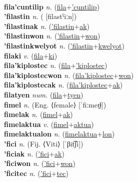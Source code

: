  \label{fila'cosawnwon} \\
\textbf{fila'cuntilip} \textit{n.} (\hyperref[fila]{fila}+\hyperref['cuntilip]{'cuntilip})
 \label{fila'cuntilip} \\
\textbf{'filastin} \textit{n.} ( [filastˁiːn])
 \label{'filastin} \\
\textbf{'filastinak} \textit{n.} (\hyperref['filastin]{'filastin}+\hyperref[ak]{ak})
 \label{'filastinak} \\
\textbf{'filastinwon} \textit{n.} (\hyperref['filastin]{'filastin}+\hyperref[won]{won})
 \label{'filastinwon} \\
\textbf{'filastinkwelyot} \textit{n.} (\hyperref['filastin]{'filastin}+\hyperref[kwelyot]{kwelyot})
 \label{'filastinkwelyot} \\
\textbf{filaki} \textit{v.} (\hyperref[fila]{fila}+\hyperref[ki]{ki})
 \label{filaki} \\
\textbf{fila'kiplostec} \textit{n.} (\hyperref[fila]{fila}+\hyperref['kiplostec]{'kiplostec})
 \label{fila'kiplostec} \\
\textbf{fila'kiplostecwon} \textit{n.} (\hyperref[fila'kiplostec]{fila'kiplostec}+\hyperref[won]{won})
 \label{fila'kiplostecwon} \\
\textbf{fila'kiplostecak} \textit{n.} (\hyperref[fila'kiplostec]{fila'kiplostec}+\hyperref[ak]{ak})
 \label{fila'kiplostecak} \\
\textbf{filatyen} \textit{num.} (\hyperref[fila]{fila}+\hyperref[tyen]{tyen})
 \label{filatyen} \\
\textbf{fimel} \textit{n.} (Eng. ⟨female⟩ [ˈfiːmeɪ̯ɫ])
 \label{fimel} \\
\textbf{fimelak} \textit{n.} (\hyperref[fimel]{fimel}+\hyperref[ak]{ak})
 \label{fimelak} \\
\textbf{fimelaktua} \textit{v.} (\hyperref[fimel]{fimel}+\hyperref[aktua]{aktua})
 \label{fimelaktua} \\
\textbf{fimelaktualon} \textit{n.} (\hyperref[fimelaktua]{fimelaktua}+\hyperref[lon]{lon})
 \label{fimelaktualon} \\
\textbf{'fici} \textit{n.} (Fij. ⟨Viti⟩ [ˈβit͡ʃi])
 \label{'fici} \\
\textbf{'ficiak} \textit{n.} (\hyperref['fici]{'fici}+\hyperref[ak]{ak})
 \label{'ficiak} \\
\textbf{'ficiwon} \textit{n.} (\hyperref['fici]{'fici}+\hyperref[won]{won})
 \label{'ficiwon} \\
\textbf{'ficitec} \textit{n.} (\hyperref['fici]{'fici}+\hyperref[tec]{tec})
 \label{'ficitec} \\

